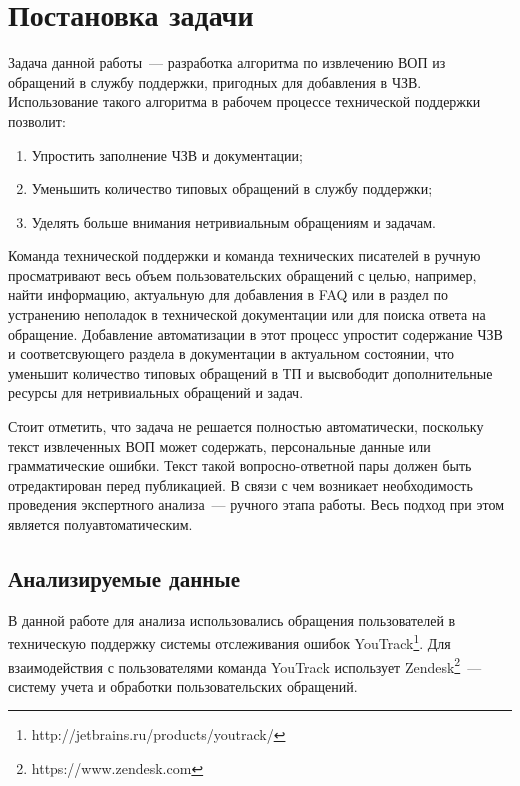 \chapter{Постановка задачи}
\label{chap:task}

Задача данной работы~--- разработка алгоритма по извлечению ВОП из обращений в службу поддержки, пригодных для добавления в ЧЗВ. Использование такого алгоритма в рабочем процессе технической поддержки позволит:

\begin{enumerate}
\item Упростить заполнение ЧЗВ и документации;
\item Уменьшить количество типовых обращений в службу поддержки;
\item Уделять больше внимания нетривиальным обращениям и задачам.
\end{enumerate}

Команда технической поддержки и команда технических писателей в ручную просматривают весь объем пользовательских обращений с целью, например, найти информацию, актуальную для добавления в FAQ или в раздел по устранению неполадок в  технической документации или для поиска ответа на обращение. Добавление автоматизации в этот процесс упростит содержание ЧЗВ и соответсвующего раздела в документации в актуальном состоянии, что уменьшит количество типовых обращений в ТП и высвободит дополнительные ресурсы для нетривиальных обращений и задач. 

Стоит отметить, что задача не решается полностью автоматически, поскольку текст извлеченных ВОП может содержать, персональные данные или грамматические ошибки. Текст такой вопросно-ответной пары должен быть отредактирован перед публикацией. В связи с чем возникает необходимость проведения экспертного анализа~--- ручного этапа работы. Весь подход при этом является полуавтоматическим.

\section{Анализируемые данные}
\label{sec:data}
В данной работе для анализа использовались обращения пользователей в техническую поддержку системы отслеживания ошибок YouTrack\footnote{http://jetbrains.ru/products/youtrack/}. Для взаимодействия с пользователями команда YouTrack использует Zendesk\footnote{https://www.zendesk.com}~--- систему учета и обработки пользовательских обращений.

